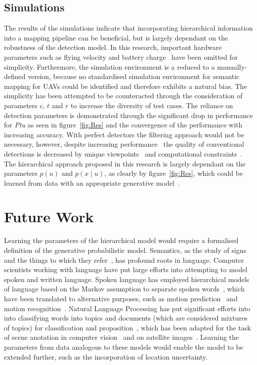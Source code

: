 \documentclass[twocolumn,letterpaper]{IEEEAerospaceCLS}  %
\begin{document}
\subsection{Simulations} \label{ssec:DiscSim}
The results of the simulations indicate that incorporating hierarchical information into a mapping pipeline can be beneficial, but is largely dependant on the robustness of the detection model. In this research, important hardware parameters such as flying velocity and battery charge~\cite{boroujerdian_mavbench_2018} have been omitted for simplicity. Furthermore, the simulation environment is a reduced to a manually-defined version, because no standardised simulation environment for semantic mapping for UAVs could be identified and therefore exhibits a natural bias. The simplicity has been attempted to be counteracted through the consideration of parameters $c$, $t$ and $r$ to increase the diversity of test cases.   
The reliance on detection parameters is demonstrated through the significant drop in performance for \emph{Ptu} as seen in figure~\ref{fig:Res} and the convergence of the performance with increasing accuracy. With perfect detectors the filtering approach would not be necessary, however, despite increasing performance~\cite{alom_history_2018} the quality of conventional detections is decreased by unique viewpoints~\cite{richardwebster_psyphy:_2019} and computational constraints~\cite{krishnan_sky_2020}. The hierarchical approach proposed in this research is largely dependant on the parameters $p(u)$ and $p(x\mid u)$, as clearly by figure~\ref{fig:Res}, which could be learned from data with an appropriate generative model~\cite{blei_latent_2003,lienou_semantic_2010}.
\section{Future Work} \label{sec:Fut}
Learning the parameters of the hierarchical model would require a formalised definition of the generative probabilistic model. Semantics, as the study of signs and the things to which they refer~\cite{kostavelis_semantic_2015}, has profound roots in language. Computer scientists working with language have put large efforts into attempting to model spoken and written language. Spoken language has employed hierarchical models of language based on the Markov assumption to separate spoken words~\cite{fine_hierarchical_1998,murphy_dynamic_2002}, which have been translated to alternative purposes, such as motion prediction~\cite{li_layered_2015} and motion recognition~\cite{oliver_layered_2002,aarno_layered_2006}. Natural Language Processing has put significant efforts into into classifying words into topics and documents (which are considered mixtures of topics) for classification and proposition~\cite{blei_latent_2003,hofmann_unsupervised_2001}, which has been adapted for the task of scene anotation in computer vision~\cite{bosch_scene_2006,fei-fei_bayesian_2005} and on satellite images~\cite{lienou_semantic_2010}. Learning the parameters from data analogous to these models would enable the model to be extended further, such as the incorporation of location uncertainty.
\end{document}
